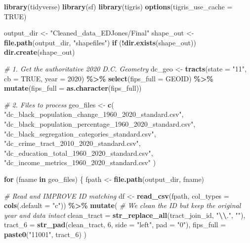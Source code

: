 \documentclass[
]{article}
\newenvironment{Shaded}{\begin{snugshade}}{\end{snugshade}}
\newcommand{\AttributeTok}[1]{\textcolor[rgb]{0.13,0.29,0.53}{#1}}
\newcommand{\CommentTok}[1]{\textcolor[rgb]{0.56,0.35,0.01}{\textit{#1}}}
\newcommand{\ConstantTok}[1]{\textcolor[rgb]{0.56,0.35,0.01}{#1}}
\newcommand{\ControlFlowTok}[1]{\textcolor[rgb]{0.13,0.29,0.53}{\textbf{#1}}}
\newcommand{\DecValTok}[1]{\textcolor[rgb]{0.00,0.00,0.81}{#1}}
\newcommand{\FunctionTok}[1]{\textcolor[rgb]{0.13,0.29,0.53}{\textbf{#1}}}
\newcommand{\NormalTok}[1]{#1}
\newcommand{\OtherTok}[1]{\textcolor[rgb]{0.56,0.35,0.01}{#1}}
\newcommand{\SpecialCharTok}[1]{\textcolor[rgb]{0.81,0.36,0.00}{\textbf{#1}}}
\newcommand{\StringTok}[1]{\textcolor[rgb]{0.31,0.60,0.02}{#1}}
\begin{document}
\begin{Shaded}
\begin{Highlighting}[]
\FunctionTok{library}\NormalTok{(tidyverse)}
\FunctionTok{library}\NormalTok{(sf)}
\FunctionTok{library}\NormalTok{(tigris)}
\FunctionTok{options}\NormalTok{(}\AttributeTok{tigris\_use\_cache =} \ConstantTok{TRUE}\NormalTok{)}

\NormalTok{output\_dir }\OtherTok{\textless{}{-}} \StringTok{"Cleaned\_data\_EDJones/Final"}
\NormalTok{shape\_out }\OtherTok{\textless{}{-}} \FunctionTok{file.path}\NormalTok{(output\_dir, }\StringTok{"shapefiles"}\NormalTok{)}
\ControlFlowTok{if}\NormalTok{ (}\SpecialCharTok{!}\FunctionTok{dir.exists}\NormalTok{(shape\_out)) }\FunctionTok{dir.create}\NormalTok{(shape\_out)}

\CommentTok{\# 1. Get the authoritative 2020 D.C. Geometry}
\NormalTok{dc\_geo }\OtherTok{\textless{}{-}} \FunctionTok{tracts}\NormalTok{(}\AttributeTok{state =} \StringTok{"11"}\NormalTok{, }\AttributeTok{cb =} \ConstantTok{TRUE}\NormalTok{, }\AttributeTok{year =} \DecValTok{2020}\NormalTok{) }\SpecialCharTok{\%\textgreater{}\%}
  \FunctionTok{select}\NormalTok{(}\AttributeTok{fips\_full =}\NormalTok{ GEOID) }\SpecialCharTok{\%\textgreater{}\%}
  \FunctionTok{mutate}\NormalTok{(}\AttributeTok{fips\_full =} \FunctionTok{as.character}\NormalTok{(fips\_full))}

\CommentTok{\# 2. Files to process}
\NormalTok{geo\_files }\OtherTok{\textless{}{-}} \FunctionTok{c}\NormalTok{(}
  \StringTok{"dc\_black\_population\_change\_1960\_2020\_standard.csv"}\NormalTok{,}
  \StringTok{"dc\_black\_population\_percentage\_1960\_2020\_standard.csv"}\NormalTok{,}
  \StringTok{"dc\_black\_segregation\_categories\_standard.csv"}\NormalTok{,}
  \StringTok{"dc\_crime\_tract\_2010\_2020\_standard.csv"}\NormalTok{,}
  \StringTok{"dc\_education\_total\_1960\_2020\_standard.csv"}\NormalTok{,}
  \StringTok{"dc\_income\_metrics\_1960\_2020\_standard.csv"}
\NormalTok{)}

\ControlFlowTok{for}\NormalTok{ (fname }\ControlFlowTok{in}\NormalTok{ geo\_files) \{}
\NormalTok{  fpath }\OtherTok{\textless{}{-}} \FunctionTok{file.path}\NormalTok{(output\_dir, fname)}
  
  \CommentTok{\# Read and IMPROVE ID matching}
\NormalTok{  df }\OtherTok{\textless{}{-}} \FunctionTok{read\_csv}\NormalTok{(fpath, }\AttributeTok{col\_types =} \FunctionTok{cols}\NormalTok{(}\AttributeTok{.default =} \StringTok{"c"}\NormalTok{)) }\SpecialCharTok{\%\textgreater{}\%}
    \FunctionTok{mutate}\NormalTok{(}
      \CommentTok{\# We clean the ID but keep the original \textquotesingle{}year\textquotesingle{} and data intact}
      \AttributeTok{clean\_tract =} \FunctionTok{str\_replace\_all}\NormalTok{(tract\_join\_id, }\StringTok{"}\SpecialCharTok{\textbackslash{}\textbackslash{}}\StringTok{."}\NormalTok{, }\StringTok{""}\NormalTok{),}
      \AttributeTok{tract\_6 =} \FunctionTok{str\_pad}\NormalTok{(clean\_tract, }\DecValTok{6}\NormalTok{, }\AttributeTok{side =} \StringTok{"left"}\NormalTok{, }\AttributeTok{pad =} \StringTok{"0"}\NormalTok{),}
      \AttributeTok{fips\_full =} \FunctionTok{paste0}\NormalTok{(}\StringTok{"11001"}\NormalTok{, tract\_6)}
\NormalTok{    )}
  

\end{Highlighting}
\end{Shaded}
\end{document}
